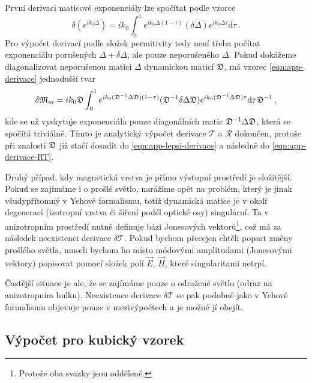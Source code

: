 První derivaci maticové exponenciály lze spočítat podle vzorce\cite{najfeldDerivativesMatrixExponential1995a}
\begin{equation}
    \label{eqn:app-derivace}
    \delta(e^{ik_0\Delta}) = ik_0\int_0^1 e^{ik_0\Delta(1-\tau)} (\delta\Delta) e^{ik_0\Delta \tau} \textrm{d}\tau \,.
\end{equation}
Pro výpočet derivací podle složek permitivity tedy není třeba počítat exponenciálu porušených $\Delta+\delta\Delta$, ale pouze neporušeného $\Delta$.
Pokud dokážeme diagonalizovat neporušenou matici $\Delta$ dynamickou maticí $\mathfrak{D}$, má vzorec \eqref{eqn:app-derivace} jednodušší tvar
\begin{equation}
    \label{eqn:app-lepsi-derivace}
    \delta\mathfrak{M}_m = ik_0 \mathfrak{D} \int_0^1 e^{ik_0 (\mathfrak{D}^{-1}\Delta\mathfrak{D})(1-\tau)} (\mathfrak{D}^{-1}\delta\Delta\mathfrak{D}) e^{ik_0(\mathfrak{D}^{-1}\Delta\mathfrak{D})\tau} \textrm{d}\tau \mathfrak{D}^{-1}\,,
\end{equation}
kde se už vyskytuje exponenciála pouze diagonálních matic $\mathfrak{D}^{-1}\Delta\mathfrak{D}$, která se spočítá triviálně.
Tímto je analytický výpočet derivace $\mathcal{T}$ a $\mathcal{R}$ dokončen, protože při znalosti $\mathfrak{D}$ již stačí dosadit do \eqref{eqn:app-lepsi-derivace} a následně do \eqref{eqn:app-derivace-RT}.

Druhý případ, kdy magnetická vrstva je přímo výstupní prostředí je složitější.
Pokud se zajímáme i o prošlé světlo, narážíme opět na problém, který je jinak všudypřítomný v Yehově formalismu, totiž dynamická matice je v okolí degenerací (izotropní vrstva či šíření podél optické osy) singulární.
Ta v anizotropním prostředí nutně definuje bázi Jonesových vektorů\footnote{Protože oba svazky jsou oddělené.}, což má za následek neexistenci derivace $\delta\mathcal{T}$.
Pokud bychom přecejen chtěli popsat změny prošlého světla, museli bychom ho místo módovými amplitudami (Jonesovými vektory) popisovat pomocí složek polí $\vec{E}$, $\vec{H}$, které singularitami netrpí.

Častější situace je ale, že se zajímáme pouze o odražené světlo (odraz na anizotropním bulku).
Neexistence derivace $\delta\mathcal{T}$ se pak podobně jako v Yehově formalismu objevuje pouze v mezivýpočtech a je možné jí obejít.



\subsection*{Výpočet pro kubický vzorek}


